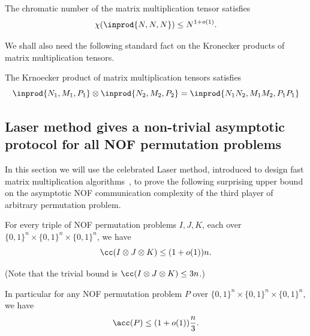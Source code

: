 \begin{corollary}
\label{cor:mat-mult-coloring}
The chromatic number of the matrix multiplication tensor satisfies
\begin{equation*}
    \chi(\inprod{N,N,N}) \leq N^{1 + o(1)}.
\end{equation*}
\end{corollary}

We shall also need the following standard fact on the Kronecker products of matrix multiplication tensors.
\begin{fact}
    \label{fct:mat-mult-product}
    The Krnoecker product of matrix multiplication tensors satisfies
    \begin{equation*}
        \inprod{N_1, M_1, P_1} \otimes \inprod{N_2, M_2, P_2} = \inprod{N_1 N_2, M_1 M_2, P_1 P_1}
    \end{equation*}
\end{fact}

\subsection{Laser method gives a non-trivial asymptotic protocol for all NOF permutation problems}
In this section we will use the celebrated Laser method, introduced to design fast matrix multiplication algorithms~\cite{S86,CW87}, to prove the following surprising upper bound on the asymptotic NOF communication complexity of the third player of arbitrary permutation problem.
\begin{theorem}
\label{thm:laser-method-ub}
For every triple of NOF permutation problems $I, J, K$, each over $\{0,1\}^n \times \{0,1\}^n \times \{0,1\}^n$, we have
\begin{equation*}
    \cc(I \otimes J \otimes K) \leq (1 + o(1))n.
\end{equation*}

(Note that the trivial bound is $\cc(I \otimes J \otimes K) \leq 3n$.)

In particular for any NOF permutation problem $P$ over $\{0,1\}^n \times \{0,1\}^n \times \{0,1\}^n$, we have 
\begin{equation*}
    \acc(P) \leq (1 + o(1))\frac{n}{3}.
\end{equation*}
\end{theorem}


